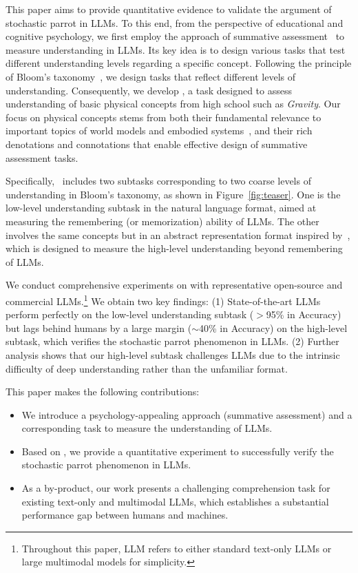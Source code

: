 This paper aims to provide quantitative evidence to validate the argument of stochastic parrot in LLMs. To this end, from the perspective of educational and cognitive psychology, we first employ the approach of summative assessment~\cite{black1998assessment,black1998inside} to measure understanding in LLMs. Its key idea is to design various tasks that test different understanding levels regarding a specific concept.
Following the principle of Bloom's taxonomy~\cite{armstrong2010bloom,krathwohl2002revision}, we design tasks that reflect different levels of understanding.
Consequently, we develop \datasetnamens, a task designed to assess understanding of basic physical concepts from high school such as {\em Gravity}.
Our focus on physical concepts stems from both their fundamental relevance to important topics of world models and embodied systems~\cite{savva2019habitat,duan2022survey,xiang2024language}, and their rich denotations and connotations that enable effective design of summative assessment tasks.

Specifically, ~\datasetname includes two subtasks corresponding to two coarse levels of understanding in Bloom's taxonomy, as shown in Figure~\ref{fig:teaser}. One is the low-level understanding subtask in the natural language format, aimed at measuring the remembering (or memorization) ability of LLMs. The other involves the same concepts but in an abstract representation format inspired by~\cite{chollet2019measure}, which is designed to measure the high-level understanding beyond remembering of LLMs.


We conduct comprehensive experiments on \datasetname with representative open-source and commercial LLMs.\footnote{{Throughout this paper, LLM refers to either standard text-only LLMs or large multimodal models for simplicity.}} We obtain two key findings: (1) State-of-the-art LLMs perform perfectly on the low-level understanding subtask ($>$95\% in Accuracy) but lags behind humans by a large margin ($\sim$40\% in Accuracy) on the high-level subtask, which verifies the stochastic parrot phenomenon in LLMs.
(2) Further analysis shows that our high-level subtask challenges LLMs due to the intrinsic difficulty of deep understanding rather than the unfamiliar format. 

This paper makes the following contributions:
\begin{itemize}[noitemsep,nolistsep,leftmargin=*]
    \item We introduce a psychology-appealing approach (summative assessment) and a corresponding task \datasetname to measure the understanding of LLMs. 
    \item Based on \datasetnamens, we provide a quantitative experiment to successfully verify the stochastic parrot phenomenon in LLMs. 
    \item {As a by-product, our work presents a challenging comprehension task for existing text-only and multimodal LLMs, which establishes a substantial performance gap between humans and machines.}
\end{itemize}
